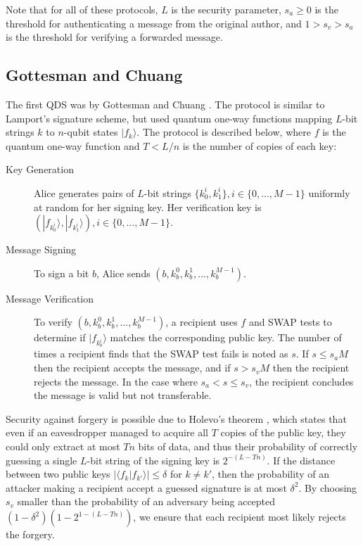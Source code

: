 \documentclass[%
 reprint,
 amsmath,amssymb,
 aps,
 pra,
]{revtex4-1}
\begin{document}
Note that for all of these protocols, $L$ is the security parameter, $s_a \geq 0$ is the threshold for authenticating a message from the original author, and $1 > s_v > s_a$ is the threshold for verifying a forwarded message.

\subsection{Gottesman and Chuang}

The first QDS was by Gottesman and Chuang \citep{quant-ph/0105032}. The protocol is similar to Lamport's signature scheme, but used quantum one-way functions mapping $L$-bit strings $k$ to $n$-qubit states $|f_k\rangle$. The protocol is described below, where $f$ is the quantum one-way function and $T < L/n$ is the number of copies of each key:

\begin{description}
\item[Key Generation]Alice generates pairs of $L$-bit strings $\{k^i_0, k^i_1\}, i \in \{0,...,M-1\}$ uniformly at random for her signing key. Her verification key is $(|f_{k^i_0}\rangle, |f_{k^i_1}\rangle), i \in \{0,...,M-1\}$.
\item[Message Signing]To sign a bit $b$, Alice sends $(b, k^0_b, k^1_b,...,k^{M-1}_b)$.
\item[Message Verification]To verify $(b, k^0_b, k^1_b,...,k^{M-1}_b)$, a recipient uses $f$ and SWAP tests \cite{PhysRevLett.87.167902} to determine if $|f_{k^i_b}\rangle$ matches the corresponding public key. The number of times a recipient finds that the SWAP test fails is noted as $s$. If $s \leq s_aM$ then the recipient accepts the message, and if $s > s_vM$ then the recipient rejects the message. In the case where $s_a < s \leq s_v$, the recipient concludes the message is valid but not transferable.
\end{description}

Security against forgery is possible due to Holevo's theorem \cite{Hol73}, which states that even if an eavesdropper managed to acquire all $T$ copies of the public key, they could only extract at most $Tn$ bits of data, and thus their probability of correctly guessing a single $L$-bit string of the signing key is $2^{-(L-Tn)}$. If the distance between two public keys $|\langle f_k|f_{k'}\rangle| \leq \delta$ for $k \neq k'$, then the probability of an attacker making a recipient accept a guessed signature is at most $\delta^2$. By choosing $s_v$ smaller than the probability of an adversary being accepted $(1 - \delta^2)(1 - 2^{1 - (L-Tn)})$, we ensure that each recipient most likely rejects the forgery.
\end{document}
